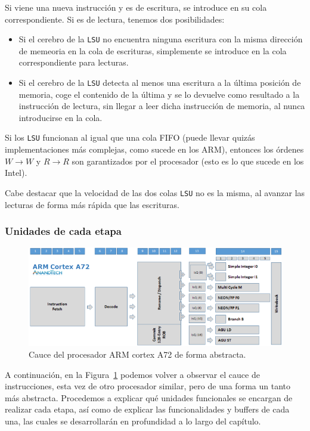 \begin{itemize}
    Si viene una nueva instrucción y es de escritura, se introduce en su cola correspondiente. Si es de lectura, tenemos dos posibilidades:
    \begin{itemize}
        \item Si el cerebro de la \verb|LSU| no encuentra ninguna escritura con la misma dirección de memeoria en la cola de escrituras, simplemente se introduce en la cola correspondiente para lecturas.
        \item Si el cerebro de la \verb|LSU| detecta al menos una escritura a la última posición de memoria, coge el contenido de la última y se lo devuelve como resultado a la instrucción de lectura, sin llegar a leer dicha instrucción de memoria, al nunca introducirse en la cola.
    \end{itemize}
    Si los \verb|LSU| funcionan al igual que una cola FIFO (puede llevar quizás implementaciones más complejas, como sucede en los ARM), entonces los órdenes $W\rightarrow W$ y $R\rightarrow R$ son garantizados por el procesador (esto es lo que sucede en los Intel).

    Cabe destacar que la velocidad de las dos colas \verb|LSU| no es la misma, al avanzar las lecturas de forma más rápida que las escrituras.
\end{itemize}

\subsubsection{Unidades de cada etapa}

\begin{figure}
    \centering
    \includegraphics[width=0.8\linewidth]{Images/Cauce2.png}
    \caption{Cauce del procesador ARM cortex A72 de forma abstracta.}
    \label{fig:Cauce_ARM_cortex_a72}
\end{figure}

A continuación, en la Figura~\ref{fig:Cauce_ARM_cortex_a72} podemos volver a observar el cauce de instrucciones, esta vez de otro procesador similar, pero de una forma un tanto más abstracta. Procedemos a explicar qué unidades funcionales se encargan de realizar cada etapa, así como de explicar las funcionalidades y buffers de cada una, las cuales se desarrollarán en profundidad a lo largo del capítulo.

